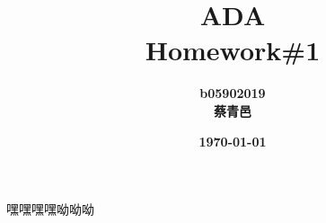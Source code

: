 \documentclass[12pt, letterpaper]{article}
\title{\bf ADA\\Homework\#1}
\author{\bf b05902019\\蔡青邑}
\date{\bf \today}
\begin{document}
\maketitle
嘿嘿嘿嘿呦呦呦
\end{document}
